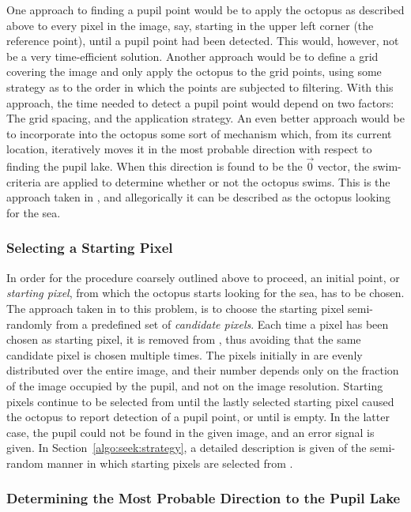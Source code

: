 One approach to finding a pupil point would be to apply the octopus as
described above to every pixel in the image, say, starting in the
upper left corner (the reference point), until a pupil point had been
detected.  This would, however, not be a very time-efficient solution.
Another approach would be to define a grid covering the image and only
apply the octopus to the grid points, using some strategy as to the
order in which the points are subjected to filtering.  With this
approach, the time needed to detect a pupil point would depend on two
factors: The grid spacing, and the application strategy.  An even
better approach would be to incorporate into the octopus some sort of
mechanism which, from its current location, iteratively moves it in
the most probable direction with respect to finding the pupil lake.
When this direction is found to be the $\vec{0}$ vector, the
swim-criteria are applied to determine whether or not the octopus
swims.  This is the approach taken in {\octopus}, and allegorically it
can be described as the octopus looking for the sea.

\subsubsection{Selecting a Starting Pixel}

In order for the procedure coarsely outlined above to proceed, an
initial point, or {\em starting pixel\/}, from which the octopus
starts looking for the sea, has to be chosen.  The approach taken in
{\octopus} to this problem, is to choose the starting pixel
semi-randomly from a predefined set {\SS} of {\em candidate pixels\/}.
Each time a pixel has been chosen as starting pixel, it is removed
from {\SS}, thus avoiding that the same candidate pixel is chosen
multiple times.  The pixels initially in {\SS} are evenly distributed
over the entire image, and their number depends only on the fraction
of the image occupied by the pupil, and not on the image resolution.
Starting pixels continue to be selected from {\SS} until the lastly
selected starting pixel caused the octopus to report detection of a
pupil point, or until {\SS} is empty.  In the latter case, the pupil
could not be found in the given image, and an error signal is given.
In Section~\ref{algo:seek:strategy}, a detailed description is given
of the semi-random manner in which starting pixels are selected from
{\SS}.

\subsubsection{Determining the Most Probable Direction to the
  Pupil Lake}

